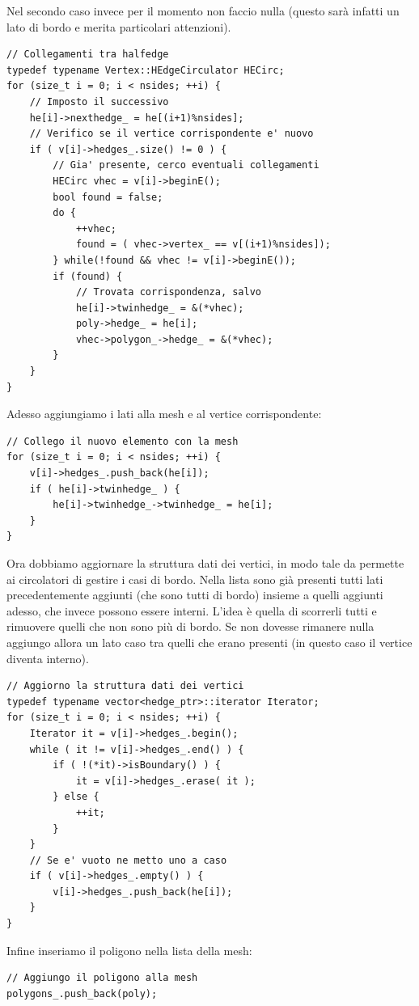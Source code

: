 Nel secondo caso invece per il momento non faccio nulla (questo sarà infatti un lato di bordo e merita particolari attenzioni). 
\begin{lstlisting}[name=addPolygon]
// Collegamenti tra halfedge
typedef typename Vertex::HEdgeCirculator HECirc;
for (size_t i = 0; i < nsides; ++i) {
    // Imposto il successivo
    he[i]->nexthedge_ = he[(i+1)%nsides];
    // Verifico se il vertice corrispondente e' nuovo
    if ( v[i]->hedges_.size() != 0 ) {
        // Gia' presente, cerco eventuali collegamenti
        HECirc vhec = v[i]->beginE();
        bool found = false;
        do {
            ++vhec;
            found = ( vhec->vertex_ == v[(i+1)%nsides]);
        } while(!found && vhec != v[i]->beginE());
        if (found) {
            // Trovata corrispondenza, salvo
            he[i]->twinhedge_ = &(*vhec);
            poly->hedge_ = he[i];
            vhec->polygon_->hedge_ = &(*vhec);
        }
    }
}
\end{lstlisting}
Adesso aggiungiamo i lati alla mesh e al vertice corrispondente:
\begin{lstlisting}[name=addPolygon]
// Collego il nuovo elemento con la mesh
for (size_t i = 0; i < nsides; ++i) {
    v[i]->hedges_.push_back(he[i]);
    if ( he[i]->twinhedge_ ) {
        he[i]->twinhedge_->twinhedge_ = he[i];
    }
}
\end{lstlisting}
Ora dobbiamo aggiornare la struttura dati dei vertici, in modo tale da permette ai circolatori di gestire i casi di bordo. Nella lista sono già presenti tutti lati precedentemente aggiunti (che sono tutti di bordo) insieme a quelli aggiunti adesso, che invece possono essere interni. L'idea è quella di scorrerli tutti e rimuovere quelli che non sono più di bordo. Se non dovesse rimanere nulla aggiungo allora un lato caso tra quelli che erano presenti (in questo caso il vertice diventa interno).
\begin{lstlisting}[name=addPolygon]
// Aggiorno la struttura dati dei vertici
typedef typename vector<hedge_ptr>::iterator Iterator;
for (size_t i = 0; i < nsides; ++i) {
    Iterator it = v[i]->hedges_.begin();
    while ( it != v[i]->hedges_.end() ) {
        if ( !(*it)->isBoundary() ) {
            it = v[i]->hedges_.erase( it );
        } else {
            ++it;
        }
    }
    // Se e' vuoto ne metto uno a caso
    if ( v[i]->hedges_.empty() ) {
        v[i]->hedges_.push_back(he[i]);
    }
}
\end{lstlisting}
Infine inseriamo il poligono nella lista della mesh:
\begin{lstlisting}[name=addPolygon]
// Aggiungo il poligono alla mesh
polygons_.push_back(poly);
\end{lstlisting}

